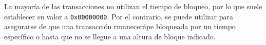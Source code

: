 \documentclass{article}
\begin{document}
    La mayoría de las transacciones no utilizan el tiempo de bloqueo, por lo que suele establecer su valor a \texttt{0x00000000}. Por el contrario, se puede utilizar para asegurarse de que una transacción rmanecerápe bloqueada por un tiempo específico o hasta que no se llegue a una altura de bloque indicado.
    
\end{document}
